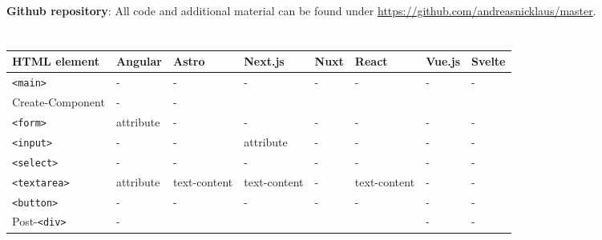 \documentclass[a4paper, 12pt]{article}
\makeatletter
\renewcommand\listoftables{%
  \section{\listtablename}%
  \@mkboth{\MakeUppercase\listtablename}{\MakeUppercase\listtablename}%
  \@starttoc{lot}%
}
\makeatother
\begin{document}
\pagebreak

{}

\vfill
\textbf{Github repository}: All code and additional material can be found under \url{https://github.com/andreasnicklaus/master}.

\pagebreak

\listoftables

\begin{table}[!ht]
  \centering
  \begin{adjustbox}{angle=90}
    \begin{tabular}{|l|l|l|l|l|l|l|l|}
      \hline
      \textbf{HTML element}           & \textbf{Angular}  & \textbf{Astro}  & \textbf{Next.js}  & \textbf{Nuxt} & \textbf{React}  & \textbf{Vue.js} & \textbf{Svelte} \\ \hline
      \verb|<main>|                   & -                 & -               & -                 & -             & -               & -               & -               \\ \hline
      Create-Component                & -                 & -               & ~                 & ~             & ~               & ~               & ~               \\ \hline
      \verb|<form>|                   & attribute         & -               & -                 & -             & -               & -               & -               \\ \hline
      \verb|<input>|                  & -                 & -               & attribute         & -             & -               & -               & -               \\ \hline
      \verb|<select>|                 & -                 & -               & -                 & -             & -               & -               & -               \\ \hline
      \verb|<textarea>|               & attribute         & text-content    & text-content      & -             & text-content    & -               & -               \\ \hline
      \verb|<button>|                 & -                 & -               & -                 & -             & -               & -               & -               \\ \hline
      Post-\verb|<div>|               & -                 & ~               & ~                 & ~             & ~               & -               & -               \\ \hline

\end{tabular}
\end{adjustbox}
\end{table}
\end{document}
